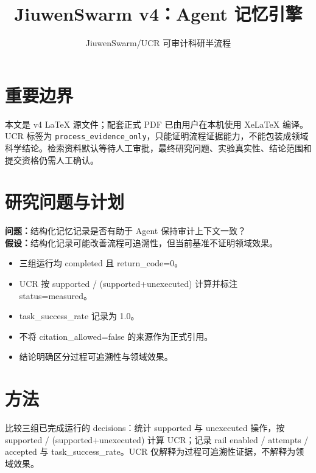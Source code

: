 \documentclass[UTF8]{ctexart}
\title{JiuwenSwarm v4：Agent 记忆引擎}
\author{JiuwenSwarm/UCR 可审计科研半流程}
\date{}
\begin{document}
\maketitle
\section{重要边界}
本文是 v4 LaTeX 源文件；配套正式 PDF 已由用户在本机使用 XeLaTeX 编译。UCR 标签为 \texttt{process\_evidence\_only}，只能证明流程证据能力，不能包装成领域科学结论。检索资料默认等待人工审批，最终研究问题、实验真实性、结论范围和提交资格仍需人工确认。
\section{研究问题与计划}
\textbf{问题：}结构化记忆记录是否有助于 Agent 保持审计上下文一致？\\
\textbf{假设：}结构化记录可能改善流程可追溯性，但当前基准不证明领域效果。
\begin{itemize}
\item 三组运行均 completed 且 return\_\allowbreak{}code=0。
\item UCR 按 supported / (supported+unexecuted) 计算并标注 status=measured。
\item task\_\allowbreak{}success\_\allowbreak{}rate 记录为 1.0。
\item 不将 citation\_\allowbreak{}allowed=false 的来源作为正式引用。
\item 结论明确区分过程可追溯性与领域效果。
\end{itemize}
\section{方法}
比较三组已完成运行的 decisions：统计 supported 与 unexecuted 操作，按 supported / (supported+unexecuted) 计算 UCR；记录 rail enabled / attempts / accepted 与 task\_\allowbreak{}success\_\allowbreak{}rate。UCR 仅解释为过程可追溯性证据，不解释为领域效果。
\end{document}
